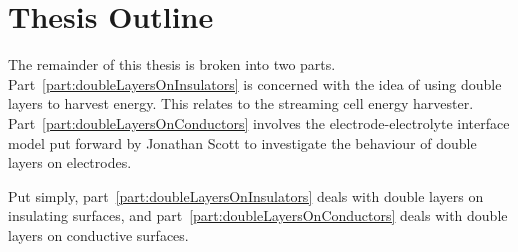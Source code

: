 \section{Thesis Outline}
  
  The remainder of this thesis is broken into two parts.
  Part~\ref{part:doubleLayersOnInsulators} is concerned with the idea of using double layers to harvest energy.
  This relates to the streaming cell energy harvester.
  Part~\ref{part:doubleLayersOnConductors} involves the electrode-electrolyte interface model put forward by Jonathan Scott to investigate the behaviour of double layers on electrodes.

  Put simply, part~\ref{part:doubleLayersOnInsulators} deals with double layers on insulating surfaces, and part~\ref{part:doubleLayersOnConductors} deals with double layers on conductive surfaces.

  
